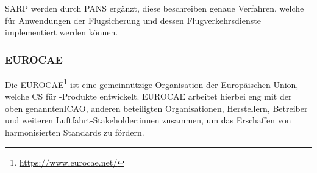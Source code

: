\ac{SARP} werden durch \ac{PANS} ergänzt, diese beschreiben genaue Verfahren, welche für Anwendungen der Flugsicherung und dessen Flugverkehrsdienste implementiert werden können. 


\subsubsection{EUROCAE}
Die \acf{EUROCAE}\footnote{\href{https://www.eurocae.net/}{https://www.eurocae.net/}} ist eine gemeinnützige Organisation der Europäischen Union, welche \acf{CS} für \atmans-Produkte entwickelt. 
\ac{EUROCAE} arbeitet hierbei eng mit der oben genannten\ac{ICAO}, anderen beteiligten Organisationen, Herstellern, Betreiber und weiteren Luftfahrt-Stakeholder:innen zusammen, um das Erschaffen von harmonisierten Standards zu fördern.

